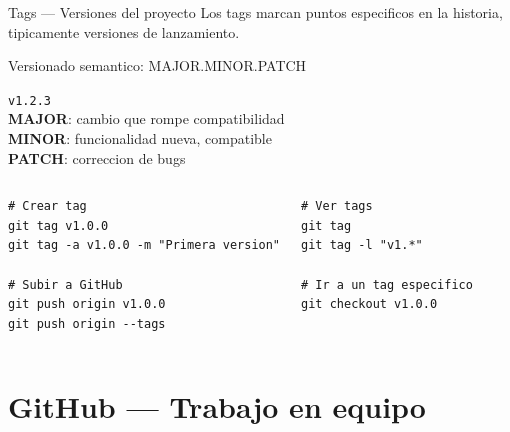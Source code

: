 \documentclass[aspectratio=169]{beamer}
\begin{document}
\begin{frame}[fragile]{Tags --- Versiones del proyecto}
  Los tags marcan puntos especificos en la historia, tipicamente versiones de lanzamiento.

  \vspace{0.3cm}

  \begin{block}{Versionado semantico: MAJOR.MINOR.PATCH}
    \begin{center}
      \texttt{v\textcolor{rojo}{1}.\textcolor{naranja}{2}.\textcolor{verde}{3}}\\[0.3cm]
      \textcolor{rojo}{\textbf{MAJOR}}: cambio que rompe compatibilidad\\
      \textcolor{naranja}{\textbf{MINOR}}: funcionalidad nueva, compatible\\
      \textcolor{verde}{\textbf{PATCH}}: correccion de bugs
    \end{center}
  \end{block}

  \vspace{0.3cm}

  \begin{columns}
    \begin{lstlisting}[style=bash]
# Crear tag
git tag v1.0.0
git tag -a v1.0.0 -m "Primera version"

# Subir a GitHub
git push origin v1.0.0
git push origin --tags
    \end{lstlisting}

    \begin{lstlisting}[style=bash]
# Ver tags
git tag
git tag -l "v1.*"

# Ir a un tag especifico
git checkout v1.0.0
    \end{lstlisting}
  \end{columns}
\end{frame}

\section{GitHub --- Trabajo en equipo}
\end{document}
